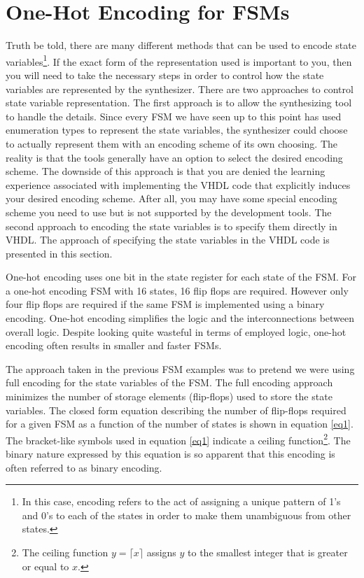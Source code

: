 \section{One-Hot Encoding for FSMs}
Truth be told, there are many different methods that can be used to encode state variables\footnote{In this case, encoding refers to the act of assigning a unique pattern of  1's and 0's to each of the states in order to make them unambiguous from other states.}. If the exact form of the representation used is important to you, then you will need to take the necessary steps in order to control how the state variables are represented by the synthesizer. There are two approaches to control state variable representation. The first approach is to allow the synthesizing tool to handle the details. Since every FSM we have seen up to this point has used enumeration types to represent the state variables, the synthesizer could choose to actually represent them with an encoding scheme of its own choosing. The reality is that the tools generally have an option to select the desired encoding scheme. The downside of this approach is that you are denied the learning experience associated with implementing the VHDL code that explicitly induces your desired encoding scheme. After all, you may have some special encoding scheme you need to use but is not supported by the development tools. The second approach to encoding the state variables is to specify them directly in VHDL. The approach of specifying the state variables in the VHDL code is presented in this section. 

One-hot encoding uses one bit in the state register for each state of the FSM. For a one-hot encoding FSM with 16 states, 16 flip flops are required. However only four flip flops are required if the same FSM is implemented using a binary encoding. One-hot encoding simplifies the logic and the interconnections between overall logic. Despite looking quite wasteful in terms of employed logic, one-hot encoding often results in smaller and faster FSMs.

The approach taken in the previous FSM examples was to pretend we were using full encoding for the state variables of the FSM. The full encoding approach minimizes the number of storage elements (flip-flops) used to store the state variables. The closed form equation describing the number of flip-flops required for a given FSM as a function of the number of states is shown in equation \ref{eq1}. The bracket-like symbols used in equation \ref{eq1} indicate a ceiling function\footnote{The ceiling function $y=\lceil x \rceil$ assigns $y$ to the smallest integer that is greater or equal to $x$.}. The binary nature expressed by this equation is so apparent that this encoding is often referred to as binary encoding.

